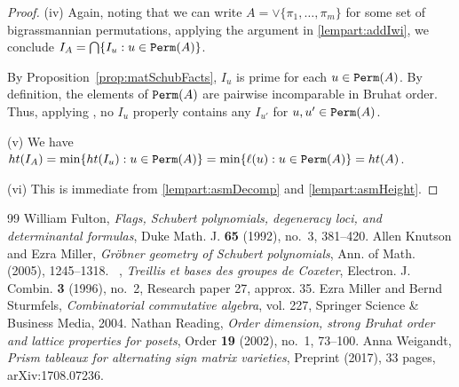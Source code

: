 \documentclass[10pt,a4paper]{amsart}
\providecommand{\bysame}{\textemdash\textemdash\textemdash\ }
\newtheorem{Main Conjecture}[theorem]{Main Conjecture}
\theoremstyle{remark}
\theoremstyle{plain}
\newcommand{\hgt}{{\rm{ht }}}
\newcommand{\perm}{{\tt Perm}}
\begin{document}
\begin{proof}
\noindent (iv) Again, noting that we can write $A= \vee \{\pi_1,\ldots,\pi_m\}$ for some set of bigrassmannian permutations, applying the argument in \ref{lempart:addIwi}, we conclude 
$ I_A= \bigcap\{ I_u:u\in \perm(A)\}$.

By Proposition~\ref{prop:matSchubFacts}, $I_u$ is prime for each $u\in \perm(A)$.  By definition, the elements of $\perm(A)$ are pairwise incomparable in Bruhat order.  Thus, applying \cite[Lemma~15.19]{MS04}, no $I_u$ properly contains any $I_{u'}$ for $u,u' \in \perm(A)$.  

\noindent (v)  We have $\hgt (I_A)=\min\{\hgt (I_u):u\in \perm(A)\}=\min\{\ell(u):u\in \perm(A)\}=\hgt(A)$.

\noindent (vi) This is immediate from \ref{lempart:asmDecomp} and \ref{lempart:asmHeight}.
\end{proof}

\begin{thebibliography}{99}
 William Fulton, \emph{Flags, {S}chubert polynomials, degeneracy loci, and determinantal formulas}, Duke Math. J. \textbf{65} (1992), no.~3, 381--420.
 Allen Knutson and Ezra Miller, \emph{Gr{\"o}bner geometry of {S}chubert polynomials}, Ann. of Math. (2005), 1245--1318.
 \bysame, \emph{Treillis et bases des groupes de {C}oxeter}, Electron. J. Combin. \textbf{3} (1996), no.~2, Research paper 27, approx. 35.
 Ezra Miller and Bernd Sturmfels, \emph{Combinatorial commutative algebra}, vol. 227, Springer Science \& Business Media, 2004.
 Nathan Reading, \emph{Order dimension, strong {B}ruhat order and lattice properties for posets}, Order \textbf{19} (2002), no.~1, 73--100.
 Anna Weigandt, \emph{Prism tableaux for alternating sign matrix varieties}, Preprint (2017), 33 pages, {\sf arXiv:1708.07236}.
\end{thebibliography}
\end{document}
